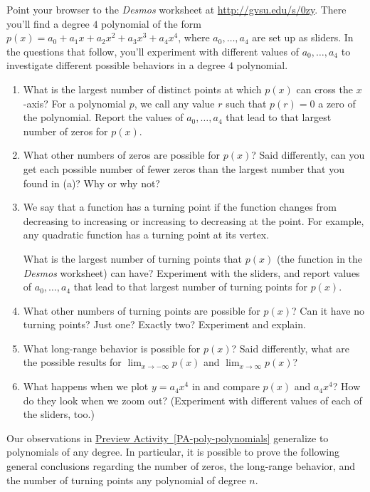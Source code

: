 \documentclass{ximera}
\begin{document}
\begin{exploration}
Point your browser to the \emph{Desmos} worksheet at \href{http://gvsu.edu/s/0zy}{http://gvsu.edu/s/0zy}.  There you'll find a degree $4$ polynomial of the form $p(x) = a_0 + a_1x + a_2x^2 + a_3x^3 + a_4x^4$, where $a_0, \ldots, a_4$ are set up as sliders.  In the questions that follow, you'll experiment with different values of $a_0, \ldots, a_4$ to investigate different possible behaviors in a degree $4$ polynomial.%
\begin{enumerate}[label=\alph*.]
\item What is the largest number of distinct points at which $p(x)$ can cross the $x$-axis?%
For a polynomial $p$, we call any value $r$ such that $p(r) = 0$ a zero of the polynomial.  Report the values of $a_0, \ldots, a_4$ that lead to that largest number of zeros for $p(x)$.%
\item What other numbers of zeros are possible for $p(x)$?  Said differently, can you get each possible number of fewer zeros than the largest number that you found in (a)? Why or why not?%
\item We say that a function has a turning point  if the function changes from decreasing to increasing or increasing to decreasing at the point.  For example, any quadratic function has a turning point at its vertex.%

What is the largest number of turning points that $p(x)$ (the function in the \emph{Desmos} worksheet) can have?  Experiment with the sliders, and report values of $a_0, \ldots, a_4$ that lead to that largest number of turning points for $p(x)$.%
\item What other numbers of turning points are possible for $p(x)$? Can it have no turning points?  Just one?  Exactly two? Experiment and explain.%
\item What long-range behavior is possible for $p(x)$?  Said differently, what are the possible results for $\displaystyle \lim_{x \to -\infty} p(x)$ and $\displaystyle \lim_{x \to \infty} p(x)$?%
\item What happens when we plot $y = a_4 x^4$ in and compare $p(x)$ and $a_4 x^4$?  How do they look when we zoom out? (Experiment with different values of each of the sliders, too.)%
\end{enumerate}
%
\end{exploration}

%
%
%
Our observations in \hyperref[PA-poly-polynomials]{Preview Activity~\ref{PA-poly-polynomials}} generalize to polynomials of any degree.  In particular, it is possible to prove the following general conclusions regarding the number of zeros, the long-range behavior, and the number of turning points any polynomial of degree $n$.%
\end{document}
